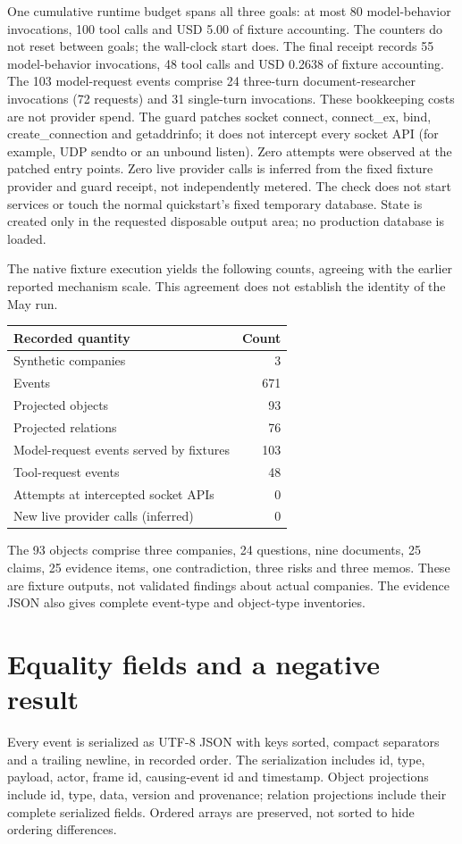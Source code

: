 \documentclass[11pt]{article}
\begin{document}
One cumulative runtime budget spans all three goals: at most 80 model-behavior invocations, 100 tool calls and USD 5.00 of fixture accounting. The counters do not reset between goals; the wall-clock start does. The final receipt records 55 model-behavior invocations, 48 tool calls and USD 0.2638 of fixture accounting. The 103 model-request events comprise 24 three-turn document-researcher invocations (72 requests) and 31 single-turn invocations. These bookkeeping costs are not provider spend. The guard patches socket connect, connect\_ex, bind, create\_connection and getaddrinfo; it does not intercept every socket API (for example, UDP sendto or an unbound listen). Zero attempts were observed at the patched entry points. Zero live provider calls is inferred from the fixed fixture provider and guard receipt, not independently metered. The check does not start services or touch the normal quickstart's fixed temporary database. State is created only in the requested disposable output area; no production database is loaded.

The native fixture execution yields the following counts, agreeing with the earlier reported mechanism scale. This agreement does not establish the identity of the May run.

\begin{center}
\begin{tabular}{lr}
\toprule
Recorded quantity & Count\\
\midrule
Synthetic companies & 3\\
Events & 671\\
Projected objects & 93\\
Projected relations & 76\\
Model-request events served by fixtures & 103\\
Tool-request events & 48\\
Attempts at intercepted socket APIs & 0\\
New live provider calls (inferred) & 0\\
\bottomrule
\end{tabular}
\end{center}

The 93 objects comprise three companies, 24 questions, nine documents, 25 claims, 25 evidence items, one contradiction, three risks and three memos. These are fixture outputs, not validated findings about actual companies. The evidence JSON also gives complete event-type and object-type inventories.

\section*{Equality fields and a negative result}
Every event is serialized as UTF-8 JSON with keys sorted, compact separators and a trailing newline, in recorded order. The serialization includes id, type, payload, actor, frame id, causing-event id and timestamp. Object projections include id, type, data, version and provenance; relation projections include their complete serialized fields. Ordered arrays are preserved, not sorted to hide ordering differences.
\end{document}

